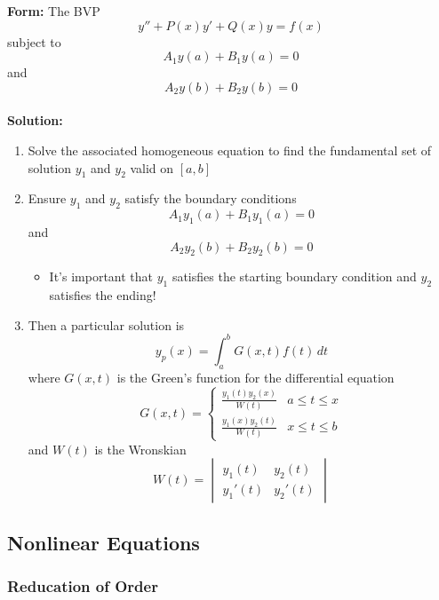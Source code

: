 \documentclass{article}
\begin{document}
\textbf{Form:} The BVP \[y'' + P(x) y' + Q(x) y = f(x)\] subject to \[A_1 y(a) + B_1 y(a) = 0\] and \[A_2 y(b) + B_2 y(b) = 0\] \\ \textbf{Solution:} \begin{enumerate}
  \item Solve the associated homogeneous equation to find the fundamental set of solution $y_1$ and $y_2$ valid on $[a, b]$

  \item Ensure $y_1$ and $y_2$ satisfy the boundary conditions \[A_1 y_1(a) + B_1 y_1(a) = 0\] and \[A_2 y_2(b) + B_2 y_2(b) = 0\]

\begin{itemize}
  \item It's important that $y_1$ satisfies the starting boundary condition and $y_2$ satisfies the ending!
\end{itemize}

\item Then a particular solution is \[y_p(x) = \int_a^b G(x, t) f(t) \,dt\] where $G(x, t)$ is the Green's function for the differential equation \[G(x, t) = \begin{cases}
            \frac{y_1(t) y_2(x)}{W(t)} & a \le t \le x \\
            \frac{y_1(x) y_2(t)}{W(t)} & x \le t \le b
          \end{cases}\] and $W(t)$ is the Wronskian \[W(t) = \begin{vmatrix}
            y_1(t)  & y_2(t)  \\
            y_1'(t) & y_2'(t)
          \end{vmatrix}\]
\end{enumerate}

\subsection{Nonlinear Equations}

\subsubsection{Reducation of Order}
\end{document}

